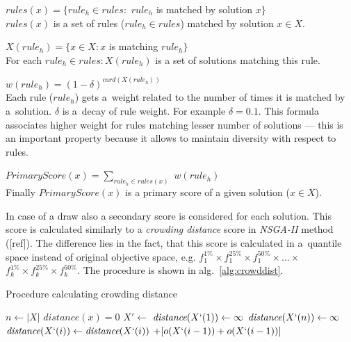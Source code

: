 \begin{description}
\item $\textit{rules}(x) = \{\textit{rule}_h \in \textit{rules} :$
$\textit{rule}_h$ is matched by solution $x\}$ \\
$\textit{rules}(x)$ is a set of rules ($\textit{rule}_h \in \textit{rules}$)
matched by solution $x \in X$. 

\item $X(\textit{rule}_h) = \{x \in X: x$ is matching $\textit{rule}_h\}$
\\ For each $\textit{rule}_h \in rules: X(\textit{rule}_h)$ is a set of
solutions matching this rule.

\item $w(\textit{rule}_h) = (1 - \delta)^{\textit{card}(X(\textit{rule}_h))}$
  \\ Each rule ($\textit{rule}_h$) gets a~weight related to the number of
  times it is matched by a~solution. $\delta$ is a~decay of rule weight. For
  example $\delta = 0.1$. This formula associates higher weight for rules
  matching lesser number of solutions --- this is an important property
  because it allows to maintain diversity with respect to rules.

\item $\textit{PrimaryScore}(x) = \sum_{\textit{rule}_h \in rules(x)}$
  $w(\textit{rule}_h)$ \\ Finally $\textit{PrimaryScore}(x)$ is a primary
  score of a given solution ($x \in X$).
\end{description}

In case of a draw also a secondary score is considered for each solution. This
score is calculated similarly to a \textit{crowding distance} score in
\textit{NSGA-II} method ([ref]). The difference lies in the fact, that this
score is calculated in a~quantile space instead of original objective space,
e.g. $f^{1\%}_1 \times f^{25\%}_1 \times f^{50\%}_1 \times \dots \times $
$f^{1\%}_k \times f^{25\%}_k \times f^{50\%}_k$. The procedure is shown in
alg.~\ref{alg:crowddist}.

\begin{algorithm}
  \caption{Procedure calculating crowding distance}\label{alg:crowddist}
  \begin{algorithmic}[1]
    \State $n \gets |X|$ 
     
    \State $\textit{distance}(x) = 0$
    \EndFor
    \State $X' \gets$  
    \State $\textit{distance}(X`(1)) \gets \infty$ 
    \State $\textit{distance}(X`(n)) \gets \infty$ 
    \EndFor
     
    \State $\textit{distance}(X`(i)) \gets \textit{distance}(X`(i))$
    $+ [o(X`(i-1)) + o(X`(i-1))]$
    \EndFor
    \EndProcedure{}
  \end{algorithmic}
\end{algorithm}

